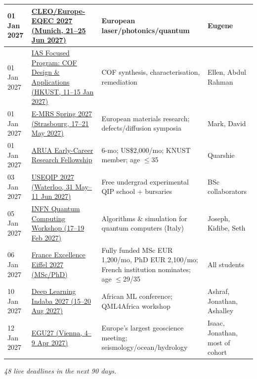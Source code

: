 \begin{longtable}{@{}p{2.0cm}p{4.4cm}p{5.2cm}p{3.0cm}@{}}
\midrule
01 Jan 2027 & \href{https://cleoeurope.org/deadlines/}{CLEO/Europe-EQEC 2027 (Munich, 21--25 Jun 2027)} & European laser/photonics/quantum & Eugene  \\
\midrule
01 Jan 2027 & \href{https://iasprogram.hkust.edu.hk/2027cofda/home.php}{IAS Focused Program: COF Design \& Applications (HKUST, 11--15 Jan 2027)} & COF synthesis, characterisation, remediation & Ellen, Abdul Rahman  \\
\midrule
01 Jan 2027 & \href{https://www.european-mrs.com/meetings/2027-spring-meeting-exhibit}{E-MRS Spring 2027 (Strasbourg, 17--21 May 2027)} & European materials research; defects/diffusion symposia & Mark, David  \\
\midrule
01 Jan 2027 & \href{https://arua.org/early-career-research-fellowships}{ARUA Early-Career Research Fellowship} & 6-mo; US\$2{,}000/mo; KNUST member; age $\leq$35 & Quarshie  \\
\midrule
03 Jan 2027 & \href{https://uwaterloo.ca/institute-for-quantum-computing/events/undergraduate-school-experimental-quantum-information-0}{USEQIP 2027 (Waterloo, 31 May--11 Jun 2027)} & Free undergrad experimental QIP school $+$ bursaries & BSc collaborators  \\
\midrule
05 Jan 2027 & \href{https://agenda.infn.it/event/53380/abstracts/}{INFN Quantum Computing Workshop (17--19 Feb 2027)} & Algorithms \& simulation for quantum computers (Italy) & Joseph, Kidibe, Seth  \\
\midrule
06 Jan 2027 & \href{https://www.campusfrance.org/en/france-excellence-eiffel-scholarship-program}{France Excellence Eiffel 2027 (MSc/PhD)} & Fully funded MSc EUR 1{,}200/mo, PhD EUR 2{,}100/mo; French institution nominates; age $\leq$29/35 & All students  \\
\midrule
10 Jan 2027 & \href{https://deeplearningindaba.com/}{Deep Learning Indaba 2027 (15--20 Aug 2027)} & African ML conference; QML4Africa workshop & Ashraf, Jonathan, Ashalley  \\
\midrule
12 Jan 2027 & \href{https://www.egu27.eu/}{EGU27 (Vienna, 4--9 Apr 2027)} & Europe's largest geoscience meeting; seismology/ocean/hydrology & Isaac, Jonathan, most of cohort  \\
\midrule
\bottomrule
\end{longtable}

\noindent\emph{48 live deadlines in the next 90 days.}

